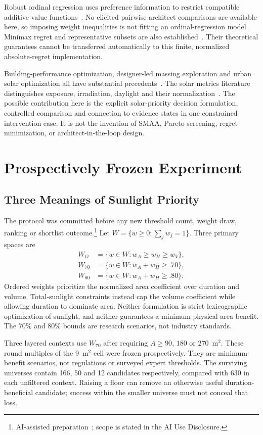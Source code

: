 \documentclass{llncs}
\newcommand{\aidraft}{\footnote{AI-assisted preparation~\cite{openai2026}; scope is stated in the AI Use Disclosure.}}
\begin{document}
Robust ordinal regression uses preference information to restrict compatible additive value functions~\cite{GrecoMousseauSlowinski2008}. No elicited pairwise architect comparisons are available here, so imposing weight inequalities is not fitting an ordinal-regression model. Minimax regret and representative subsets are also established~\cite{BoutilierEtAl2006,NanongkaiEtAl2010}. Their theoretical guarantees cannot be transferred automatically to this finite, normalized absolute-regret implementation.

Building-performance optimization, designer-led massing exploration and urban solar optimization all have substantial precedents~\cite{NguyenReiterRigo2014,WangJanssenJi2024,LiHeZhao2024,LiuEtAl2023}. The solar metrics literature distinguishes exposure, irradiation, daylight and their normalization~\cite{czachura2022metrics,compagnon2004urban}. The possible contribution here is the explicit solar-priority decision formulation, controlled comparison and connection to evidence states in one constrained intervention case. It is not the invention of SMAA, Pareto screening, regret minimization, or architect-in-the-loop design.

\section{Prospectively Frozen Experiment}
\subsection{Three Meanings of Sunlight Priority}
The protocol was committed before any new threshold count, weight draw, ranking or shortlist outcome.\aidraft{} Let $W=\{w\geq0:\sum_jw_j=1\}$. Three primary spaces are
\begin{align}
 W_O&=\{w\in W:w_A\geq w_H\geq w_V\},\\
 W_{70}&=\{w\in W:w_A+w_H\geq.70\},\\
 W_{80}&=\{w\in W:w_A+w_H\geq.80\}.
\end{align}
Ordered weights prioritize the normalized area coefficient over duration and volume. Total-sunlight constraints instead cap the volume coefficient while allowing duration to dominate area. Neither formulation is strict lexicographic optimization of sunlight, and neither guarantees a minimum physical area benefit. The 70\% and 80\% bounds are research scenarios, not industry standards.

Three layered contexts use $W_{70}$ after requiring $A\geq90$, $180$ or $270$~m$^2$. These round multiples of the 9~m$^2$ cell were frozen prospectively. They are minimum-benefit scenarios, not regulations or surveyed expert thresholds. The surviving universes contain 166, 50 and 12 candidates respectively, compared with 630 in each unfiltered context. Raising a floor can remove an otherwise useful duration-beneficial candidate; success within the smaller universe must not conceal that loss.
\end{document}
